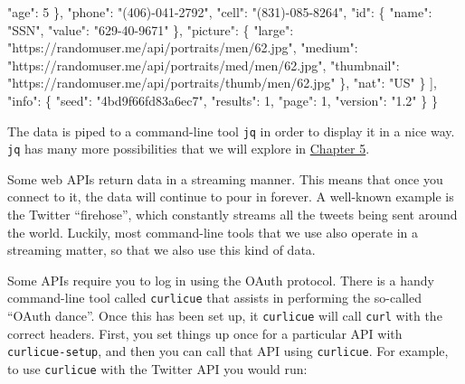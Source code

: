 \documentclass[
]{book}
\newenvironment{Shaded}{\begin{snugshade}}{\end{snugshade}}
\newcommand{\NormalTok}[1]{#1}
\newcommand{\StringTok}[1]{\textcolor[rgb]{0.31,0.60,0.02}{#1}}
\theoremstyle{definition}
\theoremstyle{definition}
\theoremstyle{definition}
\theoremstyle{remark}
\begin{document}
\begin{Shaded}
\begin{Highlighting}[]
        \StringTok{"age"}\NormalTok{: 5}
\NormalTok{      \},}
      \StringTok{"phone"}\NormalTok{: }\StringTok{"(406)-041-2792"}\NormalTok{,}
      \StringTok{"cell"}\NormalTok{: }\StringTok{"(831)-085-8264"}\NormalTok{,}
      \StringTok{"id"}\NormalTok{: \{}
        \StringTok{"name"}\NormalTok{: }\StringTok{"SSN"}\NormalTok{,}
        \StringTok{"value"}\NormalTok{: }\StringTok{"629-40-9671"}
\NormalTok{      \},}
      \StringTok{"picture"}\NormalTok{: \{}
        \StringTok{"large"}\NormalTok{: }\StringTok{"https://randomuser.me/api/portraits/men/62.jpg"}\NormalTok{,}
        \StringTok{"medium"}\NormalTok{: }\StringTok{"https://randomuser.me/api/portraits/med/men/62.jpg"}\NormalTok{,}
        \StringTok{"thumbnail"}\NormalTok{: }\StringTok{"https://randomuser.me/api/portraits/thumb/men/62.jpg"}
\NormalTok{      \},}
      \StringTok{"nat"}\NormalTok{: }\StringTok{"US"}
\NormalTok{    \}}
\NormalTok{  ],}
  \StringTok{"info"}\NormalTok{: \{}
    \StringTok{"seed"}\NormalTok{: }\StringTok{"4bd9f66fd83a6ec7"}\NormalTok{,}
    \StringTok{"results"}\NormalTok{: 1,}
    \StringTok{"page"}\NormalTok{: 1,}
    \StringTok{"version"}\NormalTok{: }\StringTok{"1.2"}
\NormalTok{  \}}
\NormalTok{\}}
\end{Highlighting}
\end{Shaded}

The data is piped to a command-line tool \texttt{jq} in order to display it in a nice way. \texttt{jq} has many more possibilities that we will explore in \protect\hyperlink{chapter-5-scrubbing-data}{Chapter 5}.

Some web APIs return data in a streaming manner. This means that once you connect to it, the data will continue to pour in forever. A well-known example is the Twitter ``firehose'', which constantly streams all the tweets being sent around the world. Luckily, most command-line tools that we use also operate in a streaming matter, so that we also use this kind of data.

Some APIs require you to log in using the OAuth protocol. There is a handy command-line tool called \texttt{curlicue} \citep{curlicue} that assists in performing the so-called ``OAuth dance''. Once this has been set up, it \texttt{curlicue} will call \texttt{curl} with the correct headers. First, you set things up once for a particular API with \texttt{curlicue-setup}, and then you can call that API using \texttt{curlicue}. For example, to use \texttt{curlicue} with the Twitter API you would run:
\end{document}
